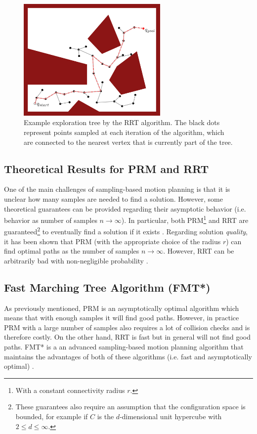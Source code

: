 \begin{figure}[ht]
  \centering
  \includegraphics[width=0.65\textwidth]{tex/figs/ch06_figs/rrt.png}
  \caption{Example exploration tree by the RRT algorithm. The black dots represent points sampled at each iteration of the algorithm, which are connected to the nearest vertex that is currently part of the tree.}
  \label{fig:rrt-graph}
\end{figure}

\subsection{Theoretical Results for PRM and RRT}
One of the main challenges of sampling-based motion planning is that it is unclear how many samples are needed to find a solution. However, some theoretical guarantees can be provided regarding their asymptotic behavior (i.e. behavior as number of samples $n \xrightarrow{} \infty$). In particular, both PRM\footnote[][-8\baselineskip]{With a constant connectivity radius $r$.} and RRT are guaranteed\footnote[][-8\baselineskip]{These guarantees also require an assumption that the configuration space is bounded, for example if $C$ is the $d$-dimensional unit hypercube with $2 \leq d \leq \infty$.} to eventually find a solution if it exists \cite[-4\baselineskip]{LaValle1998}\cite[-\baselineskip]{KavrakiSvestkaEtAl1996}.
Regarding solution \textit{quality}, it has been shown that PRM (with the appropriate choice of the radius $r$) can find optimal paths as the number of samples $n \xrightarrow{} \infty$. However, RRT can be arbitrarily bad with non-negligible probability \cite{KaramanFrazzoli2011}.

\subsection{Fast Marching Tree Algorithm (FMT*)}
As previously mentioned, PRM is an asymptotically optimal algorithm which means that with enough samples it will find good paths. However, in practice PRM with a large number of samples also requires a lot of collision checks and is therefore costly. On the other hand, RRT is fast but in general will not find good paths.
FMT* is a an advanced sampling-based motion planning algorithm that maintains the advantages of both of these algorithms (i.e. fast and asymptotically optimal) \cite{JansonSchmerlingEtAl2015}.


